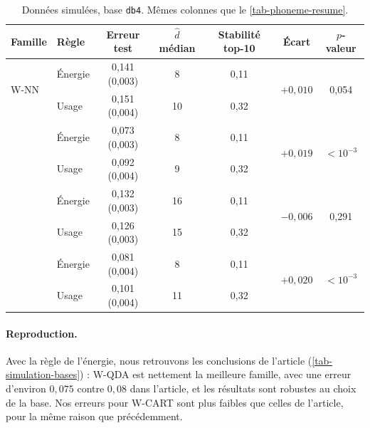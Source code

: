 \begin{table}[ht]
\centering
\small
\begin{tabular}{@{}llccccc@{}}
\toprule
Famille & Règle & Erreur test & $\hat d$ médian & Stabilité top-10 & Écart & $p$-valeur \\
\midrule
\multirow{2}{*}{W-NN} & Énergie & 0{,}141 (0{,}003) & 8 & 0{,}11 & \multirow{2}{*}{$+0{,}010$} & \multirow{2}{*}{0{,}054} \\
 & Usage & 0{,}151 (0{,}004) & 10 & 0{,}32 &  &  \\
\addlinespace
\multirow{2}{*}{W-QDA} & Énergie & 0{,}073 (0{,}003) & 8 & 0{,}11 & \multirow{2}{*}{$+0{,}019$} & \multirow{2}{*}{$<10^{-3}$} \\
 & Usage & 0{,}092 (0{,}004) & 9 & 0{,}32 &  &  \\
\addlinespace
\multirow{2}{*}{W-CART} & Énergie & 0{,}132 (0{,}003) & 16 & 0{,}11 & \multirow{2}{*}{$-0{,}006$} & \multirow{2}{*}{0{,}291} \\
 & Usage & 0{,}126 (0{,}003) & 15 & 0{,}32 &  &  \\
\addlinespace
\multirow{2}{*}{Toutes} & Énergie & 0{,}081 (0{,}004) & 8 & 0{,}11 & \multirow{2}{*}{$+0{,}020$} & \multirow{2}{*}{$<10^{-3}$} \\
 & Usage & 0{,}101 (0{,}004) & 11 & 0{,}32 &  &  \\
\bottomrule
\end{tabular}

\caption{Données simulées, base \texttt{db4}. Mêmes colonnes que le \cref{tab-phoneme-resume}.}
\label{tab-simulation-resume}
\end{table}

\paragraph{Reproduction.} Avec la règle de l'énergie, nous retrouvons les conclusions de l'article (\cref{tab-simulation-bases}) : W-QDA est nettement la meilleure famille, avec une erreur d'environ $0{,}075$ contre $0{,}08$ dans l'article, et les résultats sont robustes au choix de la base. Nos erreurs pour W-CART sont plus faibles que celles de l'article, pour la même raison que précédemment.

